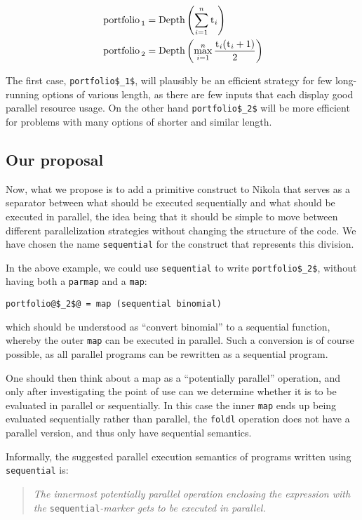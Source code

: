 \begin{align*}
  \text{\lstinline{portfolio}}_1 &= \textrm{Depth}\left(\sum_{i=1}^{n} \text{\lstinline{t}}_i\right) \\
  \text{\lstinline{portfolio}}_2 &= \textrm{Depth}\left(\max_{i=1}^{n} \frac{\text{\lstinline{t}}_i(\text{\lstinline{t}}_i+1)}{2}\right) \\
\end{align*}

The first case, \lstinline[mathescape]{portfolio$_1$}, will plausibly be an
efficient strategy for few long-running options of various length, as there are
few inputs that each display good parallel resource usage. On the other hand
\lstinline[mathescape]{portfolio$_2$} will be more efficient for problems with
many options of shorter and similar length.

\subsection{Our proposal}
Now, what we propose is to add a primitive construct to Nikola that
serves as a separator between what should be executed sequentially and
what should be executed in parallel, the idea being that it should be
simple to move between different parallelization strategies  without
changing the structure of the code. We have chosen the name \lstinline{sequential}
for the construct that represents this division.

In the above example, we could use \lstinline{sequential} to write
\lstinline[mathescape]{portfolio$_2$}, without having both a \lstinline{parmap}
and a \lstinline{map}:
\begin{lstlisting}
portfolio@$_2$@ = map (sequential binomial)
\end{lstlisting}
which should be understood as ``convert binomial'' to a sequential
function, whereby the outer \lstinline{map} can be executed in
parallel. Such a conversion is of course possible, as all parallel
programs can be rewritten as a sequential program.

One should then think about a map as a ``potentially parallel'' operation,
and only after investigating the point of use can we determine
whether it is to be evaluated in parallel or sequentially. In this
case the inner \lstinline{map} ends up being evaluated sequentially
rather than parallel, the \lstinline{foldl} operation does not have a
parallel version, and thus only have sequential semantics.

Informally, the suggested parallel execution semantics of programs written using
\lstinline{sequential} is:
\begin{quote}
  \emph{The innermost potentially parallel operation enclosing the
    expression with the }\lstinline{sequential}\emph{-marker gets to
    be executed in parallel.}
\end{quote}

